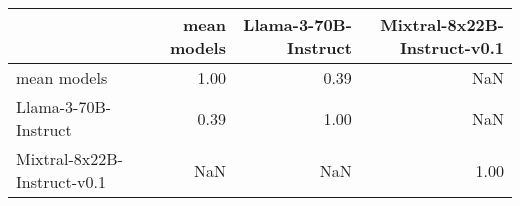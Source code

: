 \begin{tabular}{lrrr}
\toprule
 & mean models & Llama-3-70B-Instruct & Mixtral-8x22B-Instruct-v0.1 \\
\midrule
mean models & 1.00 & 0.39 & NaN \\
Llama-3-70B-Instruct & 0.39 & 1.00 & NaN \\
Mixtral-8x22B-Instruct-v0.1 & NaN & NaN & 1.00 \\
\bottomrule
\end{tabular}
